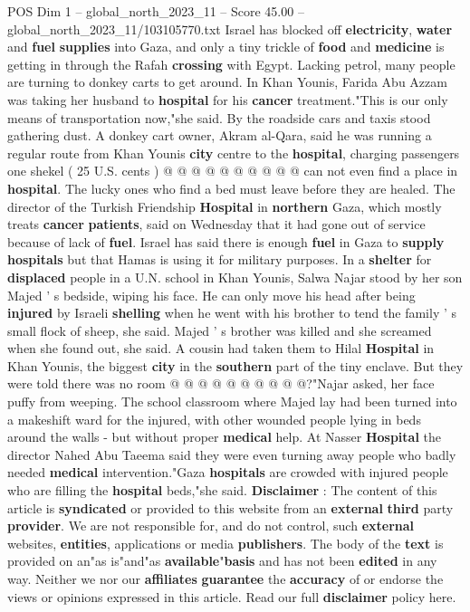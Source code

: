 \begin{textsample}{POS Dim 1 – global\_north\_2023\_11 – Score 45.00 – global\_north\_2023\_11/103105770.txt}
Israel has blocked off \textbf{electricity}, \textbf{water} and \textbf{fuel} \textbf{supplies} into Gaza, and only a tiny trickle of \textbf{food} and \textbf{medicine} is getting in through the Rafah \textbf{crossing} with Egypt.
Lacking petrol, many people are turning to donkey carts to get around.
In Khan Younis, Farida Abu Azzam was taking her husband to \textbf{hospital} for his \textbf{cancer} treatment."This is our only means of transportation now,"she said.
By the roadside cars and taxis stood gathering dust.
A donkey cart owner, Akram al-Qara, said he was running a regular route from Khan Younis \textbf{city} centre to the \textbf{hospital}, charging passengers one shekel ( 25 U.S. cents ) @ @ @ @ @ @ @ @ @ @ can not even find a place in \textbf{hospital}.
The lucky ones who find a bed must leave before they are healed.
The director of the Turkish Friendship \textbf{Hospital} in \textbf{northern} Gaza, which mostly treats \textbf{cancer} \textbf{patients}, said on Wednesday that it had gone out of service because of lack of \textbf{fuel}.
Israel has said there is enough \textbf{fuel} in Gaza to \textbf{supply} \textbf{hospitals} but that Hamas is using it for military purposes.
In a \textbf{shelter} for \textbf{displaced} people in a U.N. school in Khan Younis, Salwa Najar stood by her son Majed ' s bedside, wiping his face.
He can only move his head after being \textbf{injured} by Israeli \textbf{shelling} when he went with his brother to tend the family ' s small flock of sheep, she said.
Majed ' s brother was killed and she screamed when she found out, she said.
A cousin had taken them to Hilal \textbf{Hospital} in Khan Younis, the biggest \textbf{city} in the \textbf{southern} part of the tiny enclave.
But they were told there was no room @ @ @ @ @ @ @ @ @ @?"Najar asked, her face puffy from weeping.
The school classroom where Majed lay had been turned into a makeshift ward for the injured, with other wounded people lying in beds around the walls - but without proper \textbf{medical} help.
At Nasser \textbf{Hospital} the director Nahed Abu Taeema said they were even turning away people who badly needed \textbf{medical} intervention."Gaza \textbf{hospitals} are crowded with injured people who are filling the \textbf{hospital} beds,"she said. \textbf{Disclaimer} : The content of this article is \textbf{syndicated} or provided to this website from an \textbf{external} \textbf{third} party \textbf{provider}.
We are not responsible for, and do not control, such \textbf{external} websites, \textbf{entities}, applications or media \textbf{publishers}.
The body of the \textbf{text} is provided on an"as is"and"as \textbf{available}"\textbf{basis} and has not been \textbf{edited} in any way.
Neither we nor our \textbf{affiliates} \textbf{guarantee} the \textbf{accuracy} of or endorse the views or opinions expressed in this article.
Read our full \textbf{disclaimer} policy here.


\end{textsample}
